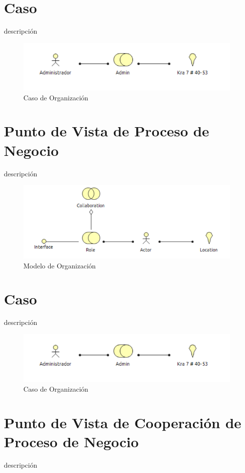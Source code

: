 \newpage
\section{Caso}
descripción

\begin{figure}[th!]
	\centering
	\includegraphics[width=0.7\linewidth]{arquitectura/negocio/imgs/c_organizacion}
	\caption{Caso de Organización}
\end{figure}
\newpage

\section{Punto de Vista de Proceso de Negocio}
descripción


\begin{figure}[th!]
	\centering
	\includegraphics[width=0.7\linewidth]{arquitectura/negocio/imgs/m_organizacion}
	\caption{Modelo de Organización}
\end{figure}

\newpage
\section{Caso}
descripción

\begin{figure}[th!]
	\centering
	\includegraphics[width=0.7\linewidth]{arquitectura/negocio/imgs/c_organizacion}
	\caption{Caso de Organización}
\end{figure}
\newpage

\section{Punto de Vista de Cooperación de Proceso de Negocio}
descripción


